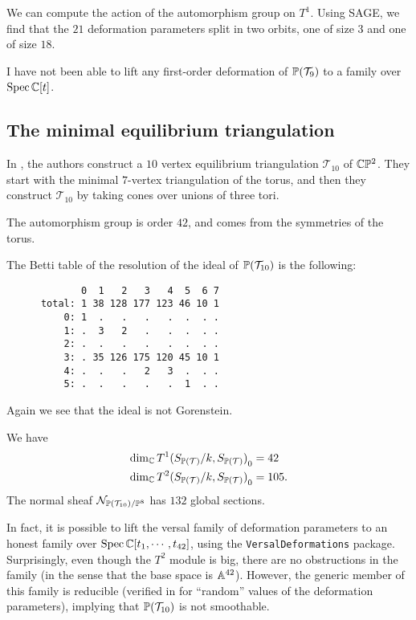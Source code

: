 We can compute the action of the automorphism group on $T^1$. Using SAGE, we find that the $21$ deformation parameters split in two orbits, one of size $3$ and one of size $18$.

I have not been able to lift any first-order deformation of $\P(\mathcal T_9)$ to a family over $\Spec \C[t]$. 

\subsection{The minimal equilibrium triangulation}

In \cite{banchoff_equilibrium}, the authors construct a $10$ vertex equilibrium triangulation $\mathcal T_{10}$  of $\C \P^2$. They start with the minimal $7$-vertex triangulation of the torus, and then they construct $\mathcal T_{10}$ by taking cones over unions of three tori.

The automorphism group is order $42$, and comes from the symmetries of the torus. 

The Betti table of the resolution of the ideal of $\P(\mathcal T_{10})$ is the following:
\begin{verbatim}
             0  1   2   3   4  5  6 7
      total: 1 38 128 177 123 46 10 1
          0: 1  .   .   .   .  .  . .
          1: .  3   2   .   .  .  . .
          2: .  .   .   .   .  .  . .
          3: . 35 126 175 120 45 10 1
          4: .  .   .   2   3  .  . .
          5: .  .   .   .   .  1  . .
\end{verbatim}

Again we see that the ideal is not Gorenstein.

\begin{proposition}
We have 
\begin{eqnarray*}
\dim_\C  {T^1(S_{\P(\mathcal T)}/k, S_{\P(\mathcal T)})}_0 &= 42 \\
\dim_\C {T^2(S_{\P(\mathcal T)}/k, S_{\P(\mathcal T)})}_0  &= 105.
\end{eqnarray*}
The normal sheaf $\mathcal N_{\P(\mathcal T_{10})/\P^{8}}$ has $132$ global sections.
\end{proposition}

In fact, it is possible to lift the versal family of deformation parameters to an honest family over $\Spec \C[t_1,\cdots,t_{42}]$, using the \texttt{VersalDeformations} package. Surprisingly, even though the $T^2$ module is big, there are no obstructions in the family (in the sense that the base space is $\A^{42}$). However, the generic member of this family is reducible (verified in \MM for ``random'' values of the deformation parameters), implying that $\P(\mathcal T_{10})$ is not smoothable.

